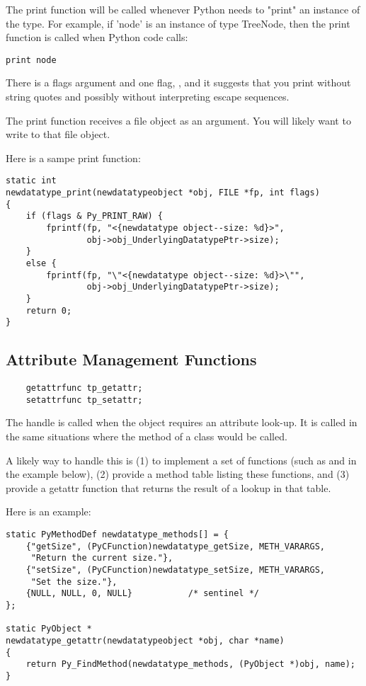 The print function will be called whenever Python needs to "print" an
instance of the type.  For example, if 'node' is an instance of type
TreeNode, then the print function is called when Python code calls:

\begin{verbatim}
print node
\end{verbatim}

There is a flags argument and one flag, , and
it suggests that you print without string quotes and possibly without
interpreting escape sequences.

The print function receives a file object as an argument. You will
likely want to write to that file object.

Here is a sampe print function:

\begin{verbatim}
static int
newdatatype_print(newdatatypeobject *obj, FILE *fp, int flags)
{
    if (flags & Py_PRINT_RAW) {
        fprintf(fp, "<{newdatatype object--size: %d}>",
                obj->obj_UnderlyingDatatypePtr->size);
    }
    else {
        fprintf(fp, "\"<{newdatatype object--size: %d}>\"",
                obj->obj_UnderlyingDatatypePtr->size);
    }
    return 0;
}
\end{verbatim}


\subsection{Attribute Management Functions}

\begin{verbatim}
    getattrfunc tp_getattr;
    setattrfunc tp_setattr;
\end{verbatim}

The  handle is called when the object requires an
attribute look-up.  It is called in the same situations where the
 method of a class would be called.

A likely way to handle this is (1) to implement a set of functions
(such as  and
 in the example below), (2) provide a
method table listing these functions, and (3) provide a getattr
function that returns the result of a lookup in that table.

Here is an example:

\begin{verbatim}
static PyMethodDef newdatatype_methods[] = {
    {"getSize", (PyCFunction)newdatatype_getSize, METH_VARARGS,
     "Return the current size."},
    {"setSize", (PyCFunction)newdatatype_setSize, METH_VARARGS,
     "Set the size."},
    {NULL, NULL, 0, NULL}           /* sentinel */
};

static PyObject *
newdatatype_getattr(newdatatypeobject *obj, char *name)
{
    return Py_FindMethod(newdatatype_methods, (PyObject *)obj, name);
}
\end{verbatim}


